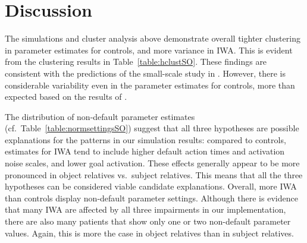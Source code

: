 \documentclass[10pt,letterpaper]{article}
\begin{document}

\section{Discussion}

The simulations and cluster analysis above demonstrate overall tighter clustering in parameter estimates for controls, and more variance in IWA. This is evident from the clustering results in Table~\ref{table:hclustSO}.
These findings are consistent with the predictions of the small-scale study in . However, there is considerable variability even in the parameter estimates for controls, more than expected based on the results of .

The distribution of non-default parameter estimates (cf.\ Table~\ref{table:normsettingsSO})
suggest that all three hypotheses are possible explanations for the patterns in our simulation results: compared to controls, estimates for IWA tend to include higher default action times and activation noise scales, and lower goal activation. These effects generally appear to be more pronounced in object relatives vs.\ subject relatives. This means that all the three hypotheses can be considered viable candidate explanations. 
Overall, more IWA than controls display non-default parameter settings. Although there is evidence that many IWA are affected by all three impairments in our implementation, there are also many patients that show only one or two non-default parameter values. Again, this is more the case in object relatives than in subject relatives.
\end{document}
